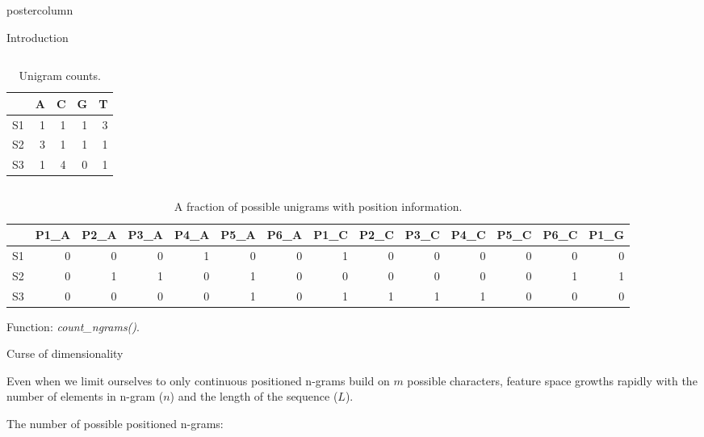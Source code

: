 \documentclass[final]{beamer}\usepackage[]{graphicx}\usepackage[]{color}
\begin{document}
\begin{frame}
\begin{columns}
\begin{column}{.51\textwidth}
\begin{beamercolorbox}[center,wd=\textwidth]{postercolumn}
\begin{minipage}[T]{.95\textwidth}
{\begin{block}{Introduction}
{\begin{columns}[c]
      
      

    
\begin{table}[ht]
\centering
\begin{tabular}{rrrrr}
  \toprule
 & A & C & G & T \\ 
  \midrule
S1 & 1 & 1 & 1 & 3 \\ 
   \rowcolor{white}S2 & 3 & 1 & 1 & 1 \\ 
  S3 & 1 & 4 & 0 & 1 \\ 
   \bottomrule
\end{tabular}
\caption{Unigram counts.} 
\end{table}


    \end{columns}

\begin{table}[ht]
\centering
\begin{tabular}{rrrrrrrrrrrrrr}
  \toprule
 & P1\_A & P2\_A & P3\_A & P4\_A & P5\_A & P6\_A & P1\_C & P2\_C & P3\_C & P4\_C & P5\_C & P6\_C & P1\_G \\ 
  \midrule
S1 & 0 & 0 & 0 & 1 & 0 & 0 & 1 & 0 & 0 & 0 & 0 & 0 & 0 \\ 
   \rowcolor{white}S2 & 0 & 1 & 1 & 0 & 1 & 0 & 0 & 0 & 0 & 0 & 0 & 1 & 1 \\ 
  S3 & 0 & 0 & 0 & 0 & 1 & 0 & 1 & 1 & 1 & 1 & 0 & 0 & 0 \\ 
   \bottomrule
\end{tabular}
\caption{A fraction of possible unigrams with position information.} 
\end{table}

}    

Function: \textit{count\_ngrams()}.
    \end{block}
    \vfill 

\begin{block}{Curse of dimensionality}
    
Even when we limit ourselves to only continuous positioned n-grams build on $m$ possible
characters, feature space growths rapidly with the number of elements in n-gram
($n$) and the length of the sequence ($L$).    
    
The number of possible positioned n-grams: 


\end{block}}
\end{minipage}
\end{beamercolorbox}
\end{column}
\end{columns}
\end{frame}
\end{document}
